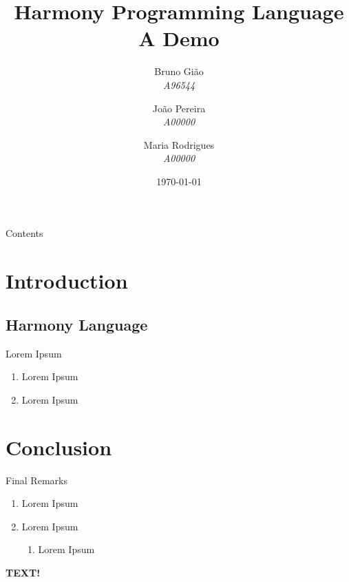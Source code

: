 \documentclass[compress,svgnames,13.7pt]{beamer}
\title[Demo]
{Harmony Programming Language\\A Demo}
\author[G01]{%
\begin{tabular}{c}
Bruno Gi\~ao\\
\textit{A96544}
\end{tabular}
\and
\begin{tabular}{c}
Jo\~ao Pereira\\
\textit{A00000}
\end{tabular}
\and
\begin{tabular}{c}
Maria Rodrigues\\
\textit{A00000}
\end{tabular}
}
\institute[DI@UM+DMAT@UM]{Departamento de Informática \and Departamento de Matemática}
\date{\today}
\begin{document}
\thispagestyle{empty}
\frame{\titlepage}


\begin{frame}{Contents}
\tableofcontents
\end{frame}


\section{Introduction}

\subsection{Harmony Language}
\begin{frame} {Lorem Ipsum}
    \begin{enumerate}
        \item{Lorem Ipsum}
    \pause\item{
            Lorem Ipsum}
    \end{enumerate}
\end{frame}

\section{Conclusion}
\begin{frame}{Final Remarks}
    \begin{enumerate}
        \item{Lorem Ipsum}
  \pause\item{Lorem Ipsum}
  \pause\begin{enumerate}
      \item{Lorem Ipsum}
        \end{enumerate}
    \end{enumerate}
\end{frame}
\begin{frame}
    \huge{\textbf{TEXT!}}
\end{frame}
\end{document}
